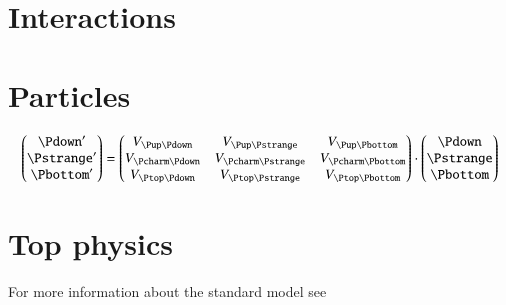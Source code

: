 \section{Interactions}

\section{Particles}

\begin{align}
\begin{pmatrix}
\Pdown^{\prime} \\
\Pstrange^{\prime} \\
\Pbottom^{\prime}
\end{pmatrix}
=
\begin{pmatrix}
\Vud & \Vus & \Vub \\
\Vcd & \Vcs & \Vcb \\
\Vtd & \Vts & \Vtb \\
\end{pmatrix}
\cdot
\begin{pmatrix}
\Pdown \\
\Pstrange \\
\Pbottom
\end{pmatrix}
\end{align}

\section{Top physics}

For more information about the standard model see ~\cite{thomson, griffiths}